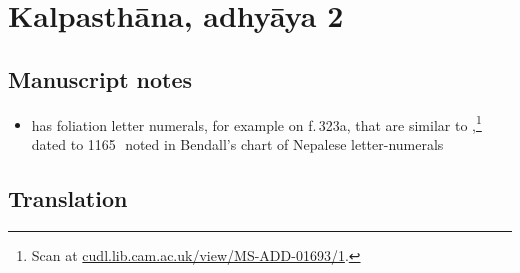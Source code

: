 
\newcommand{\plant}[4]{#1 (\emph{#2})\footnote{#3; see #4}}
\let\chemical = \plant
\newcommand{\skt}[2]{#1 (\emph{#2})}
\newcommand{\sskt}[2]{\empty}

\section{Kalpasthāna, adhyāya 2}

\subsection{Manuscript notes}



\begin{itemize}
    \item {} has foliation letter numerals, for example
on f.\,323a, that are similar to ,\footnote{Scan
at 
\href{https://cudl.lib.cam.ac.uk/view/MS-ADD-01693/1}{cudl.lib.cam.ac.uk/view/MS-ADD-01693/1}.}
 dated to 1165\,\CE\, noted in Bendall's chart of Nepalese letter-numerals 
 \cite[Lithograph V, 
after p.\,225]{bend-budd}
\end{itemize}

\newpage

\subsection{Translation}

